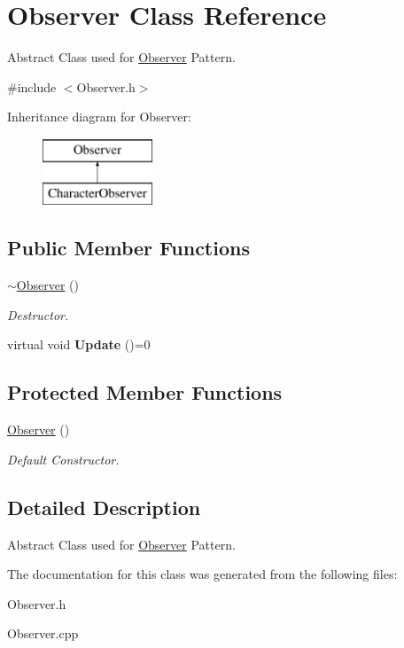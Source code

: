 \hypertarget{class_observer}{}\section{Observer Class Reference}
\label{class_observer}


Abstract Class used for \hyperlink{class_observer}{Observer} Pattern.  




{\ttfamily \#include $<$Observer.\+h$>$}

Inheritance diagram for Observer\+:\begin{figure}[H]
\begin{center}
\leavevmode
\includegraphics[height=2.000000cm]{class_observer}
\end{center}
\end{figure}
\subsection*{Public Member Functions}
\begin{DoxyCompactItemize}
\item 
\hypertarget{class_observer_a450645e61c136826f09940a1334c7f34}{}\label{class_observer_a450645e61c136826f09940a1334c7f34} 
\hyperlink{class_observer_a450645e61c136826f09940a1334c7f34}{$\sim$\+Observer} ()
\begin{DoxyCompactList}\small\item\em Destructor. \end{DoxyCompactList}\item 
\hypertarget{class_observer_a3c7c1dd5ca0f7bdb0e05098d1b7aac41}{}\label{class_observer_a3c7c1dd5ca0f7bdb0e05098d1b7aac41} 
virtual void {\bfseries Update} ()=0
\end{DoxyCompactItemize}
\subsection*{Protected Member Functions}
\begin{DoxyCompactItemize}
\item 
\hypertarget{class_observer_a19c43f80a38a332a6f694783df3c9835}{}\label{class_observer_a19c43f80a38a332a6f694783df3c9835} 
\hyperlink{class_observer_a19c43f80a38a332a6f694783df3c9835}{Observer} ()
\begin{DoxyCompactList}\small\item\em Default Constructor. \end{DoxyCompactList}\end{DoxyCompactItemize}


\subsection{Detailed Description}
Abstract Class used for \hyperlink{class_observer}{Observer} Pattern. 

The documentation for this class was generated from the following files\+:\begin{DoxyCompactItemize}
\item 
Observer.\+h\item 
Observer.\+cpp\end{DoxyCompactItemize}
